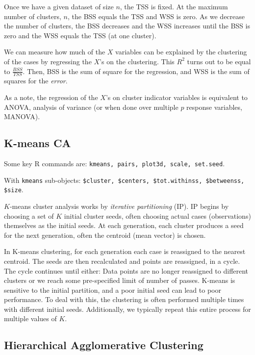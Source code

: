 Once we have a given dataset of size $n$, the TSS is fixed. At the maximum number of clusters, $n$, the BSS equals the TSS and WSS is zero. As we decrease the number of clusters, the BSS decreases and the WSS increases until the BSS is zero and the WSS equals the TSS (at one cluster).

We can measure how much of the $X$ variables can be explained by the clustering of the cases by regressing the $X$'s on the clustering. This $R^2$ turns out to be equal to $\frac{BSS}{TSS}$. Then, BSS is the sum of square for the regression, and WSS is the sum of squares for the \textit{error}. 

As a note, the regression of the $X$'s on cluster indicator variables is equivalent to ANOVA, analysis of variance (or when done over multiple $p$ response variables, MANOVA). 

\bigskip


\subsection{K-means CA}

\medskip

Some key R commands are: \texttt{kmeans, pairs, plot3d, scale, set.seed}.

With \texttt{kmeans} sub-objects: \texttt{\$cluster, \$centers, \$tot.withinss, \$betweenss, \$size}.

\medskip

$K$-means cluster analysis works by \textit{iterative partitioning} (IP). IP begins by choosing a set of $K$ initial cluster seeds, often choosing actual cases (observations) themselves as the initial seeds. At each generation, each cluster produces a seed for the next generation, often the centroid (mean vector) is chosen. 

In K-means clustering, for each generation each case is reassigned to the nearest centroid. The seeds are then recalculated and points are reassigned, in a cycle. The cycle continues until either: Data points are no longer reassigned to different clusters or we reach some pre-specified limit of number of passes. K-means is sensitive to the initial partition, and a poor initial seed can lead to poor performance. To deal with this, the clustering is often performed multiple times with different initial seeds. Additionally, we typically repeat this entire process for multiple values of $K$.

\bigskip

\subsection{Hierarchical Agglomerative Clustering}

